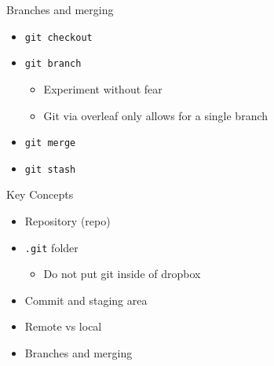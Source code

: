 \documentclass[12pt,t]{beamer}
\begin{document}
\begin{frame}{Branches and merging}
\begin{itemize}
		\vspace{1em}
    \item \texttt{git checkout} 
		\pause
		\vspace{1em}
	\item \texttt{git branch}
		\pause
		\begin{itemize}
			\item Experiment without fear
				\pause
			\item Git via overleaf only allows for a single branch
				\pause 
		\end{itemize}
		\vspace{1em}
	\item \texttt{git merge}
		\pause
		\vspace{1em}
	\item \texttt{git stash}
		\pause
		\vspace{1em}
\end{itemize}
\end{frame}

\begin{frame}{Key Concepts}
\begin{itemize}
    \item Repository (repo)
		\pause
		\vspace{1em}
    \item \texttt{.git} folder
		\pause
		\begin{itemize}
			\item Do not put git inside of dropbox
		\end{itemize}
		\pause
		\vspace{1em}
    \item Commit and staging area
		\pause
		\vspace{1em}
	\item Remote vs local
		\pause
		\vspace{1em}
    \item Branches and merging
\end{itemize}
\end{frame}

\end{document}
